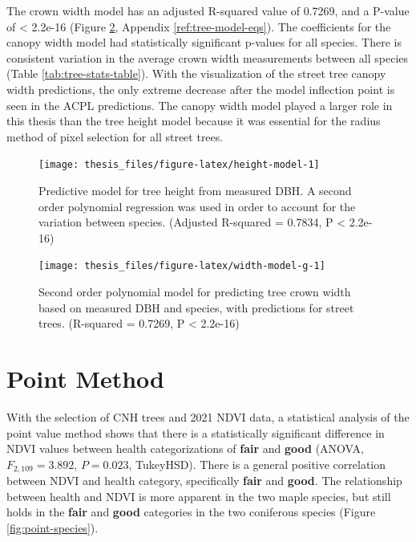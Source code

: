 \documentclass[12pt,twoside]{reedthesis}
\begin{document}
The crown width model has an adjusted R-squared value of 0.7269, and a P-value of \textless{} 2.2e-16 (Figure \ref{fig:width-model-g}, Appendix \ref{ref:tree-model-eqs}). The coefficients for the canopy width model had statistically significant p-values for all species. There is consistent variation in the average crown width measurements between all species (Table \ref{tab:tree-stats-table}). With the visualization of the street tree canopy width predictions, the only extreme decrease after the model inflection point is seen in the ACPL predictions. The canopy width model played a larger role in this thesis than the tree height model because it was essential for the radius method of pixel selection for all street trees.
\begin{figure}

{\centering \texttt{[image: thesis\_files/figure-latex/height-model-1]} 

}

\caption[Tree height predictive model]{Predictive model for tree height from measured DBH. A second order polynomial regression was used in order to account for the variation between species. (Adjusted R-squared = 0.7834, P < 2.2e-16)}\label{fig:height-model}
\end{figure}
\begin{figure}

{\centering \texttt{[image: thesis\_files/figure-latex/width-model-g-1]} 

}

\caption[Crown width predictive model]{Second order polynomial model for predicting tree crown width based on measured DBH and species, with predictions for street trees. (R-squared = 0.7269,  P < 2.2e-16)}\label{fig:width-model-g}
\end{figure}
\hypertarget{point-method-1}{%
\section{Point Method}\label{point-method-1}}

With the selection of CNH trees and 2021 NDVI data, a statistical analysis of the point value method shows that there is a statistically significant difference in NDVI values between health categorizations of \textbf{fair} and \textbf{good} (ANOVA, \(F_{2, 109} = 3.892\), \(P = 0.023\), TukeyHSD). There is a general positive correlation between NDVI and health category, specifically \textbf{fair} and \textbf{good}. The relationship between health and NDVI is more apparent in the two maple species, but still holds in the \textbf{fair} and \textbf{good} categories in the two coniferous species (Figure \ref{fig:point-species}).
\end{document}

